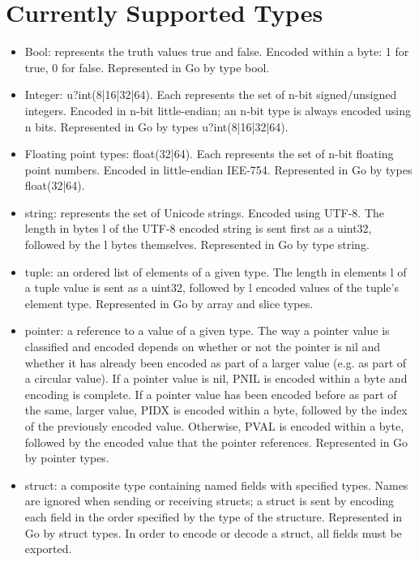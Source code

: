 \section{Currently Supported Types}

\begin{itemize}

	\item Bool: represents the truth values true and false. Encoded within a byte: 1 for true, 0 for false. Represented in Go by type bool.
	\item Integer: u?int(8|16|32|64). Each represents the set of n-bit signed/unsigned integers.
Encoded in n-bit little-endian; an n-bit type is always encoded using n bits. Represented in
Go by types u?int(8|16|32|64).
	\item Floating point types: float(32|64). Each represents the set of n-bit floating point numbers.
Encoded in little-endian IEE-754. Represented in Go by types float(32|64).

	\item string: represents the set of Unicode strings. Encoded using UTF-8. The length in bytes 
l of the UTF-8 encoded string is sent first as a uint32, followed by the l bytes themselves.
Represented in Go by type string.

	\item tuple: an ordered list of elements of a given type. The length in elements l of a tuple
value is sent as a uint32, followed by l encoded values of the tuple's element type.
Represented in Go by array and slice types.

	\item pointer: a reference to a value of a given type. The way a pointer value is classified and encoded
depends on whether or not the pointer is nil and whether it has already been encoded as part
of a larger value (e.g. as part of a circular value). If a pointer value is nil, PNIL is
encoded within a byte and encoding is complete. If a pointer value has been encoded before as
part of the same, larger value, PIDX is encoded within a byte, followed by the index of the
previously encoded value. Otherwise, PVAL is encoded within a byte, followed by the encoded value
that the pointer references. Represented in Go by pointer types.

	\item struct: a composite type containing named fields with specified types. Names are ignored when
sending or receiving structs; a struct is sent by encoding each field in the order specified by
the type of the structure. Represented in Go by struct types. In order to encode or decode a
struct, all fields must be exported.


\end{itemize}
